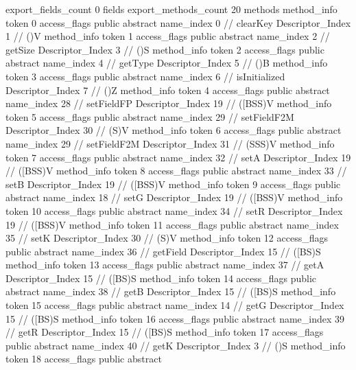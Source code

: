 {{{{			}
			export_fields_count	0
			fields {
			}
			export_methods_count	20
			methods {
				method_info {
					token	0
					access_flags	public abstract
					name_index	0		// clearKey
					Descriptor_Index	1		// ()V
				}
				method_info {
					token	1
					access_flags	public abstract
					name_index	2		// getSize
					Descriptor_Index	3		// ()S
				}
				method_info {
					token	2
					access_flags	public abstract
					name_index	4		// getType
					Descriptor_Index	5		// ()B
				}
				method_info {
					token	3
					access_flags	public abstract
					name_index	6		// isInitialized
					Descriptor_Index	7		// ()Z
				}
				method_info {
					token	4
					access_flags	public abstract
					name_index	28		// setFieldFP
					Descriptor_Index	19		// ([BSS)V
				}
				method_info {
					token	5
					access_flags	public abstract
					name_index	29		// setFieldF2M
					Descriptor_Index	30		// (S)V
				}
				method_info {
					token	6
					access_flags	public abstract
					name_index	29		// setFieldF2M
					Descriptor_Index	31		// (SSS)V
				}
				method_info {
					token	7
					access_flags	public abstract
					name_index	32		// setA
					Descriptor_Index	19		// ([BSS)V
				}
				method_info {
					token	8
					access_flags	public abstract
					name_index	33		// setB
					Descriptor_Index	19		// ([BSS)V
				}
				method_info {
					token	9
					access_flags	public abstract
					name_index	18		// setG
					Descriptor_Index	19		// ([BSS)V
				}
				method_info {
					token	10
					access_flags	public abstract
					name_index	34		// setR
					Descriptor_Index	19		// ([BSS)V
				}
				method_info {
					token	11
					access_flags	public abstract
					name_index	35		// setK
					Descriptor_Index	30		// (S)V
				}
				method_info {
					token	12
					access_flags	public abstract
					name_index	36		// getField
					Descriptor_Index	15		// ([BS)S
				}
				method_info {
					token	13
					access_flags	public abstract
					name_index	37		// getA
					Descriptor_Index	15		// ([BS)S
				}
				method_info {
					token	14
					access_flags	public abstract
					name_index	38		// getB
					Descriptor_Index	15		// ([BS)S
				}
				method_info {
					token	15
					access_flags	public abstract
					name_index	14		// getG
					Descriptor_Index	15		// ([BS)S
				}
				method_info {
					token	16
					access_flags	public abstract
					name_index	39		// getR
					Descriptor_Index	15		// ([BS)S
				}
				method_info {
					token	17
					access_flags	public abstract
					name_index	40		// getK
					Descriptor_Index	3		// ()S
				}
				method_info {
					token	18
					access_flags	public abstract
}}}}}
